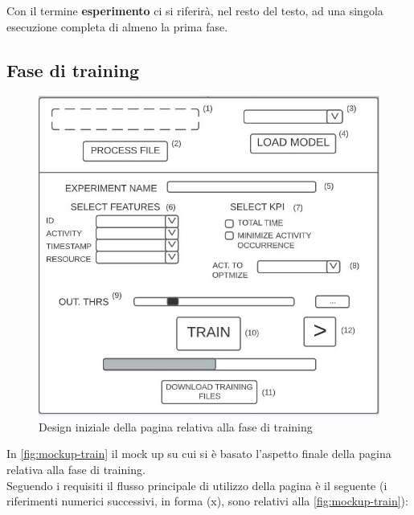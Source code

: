 Con il termine \textbf{esperimento} ci si riferirà, nel resto del testo, ad una singola esecuzione completa di almeno la prima fase.

\subsection{Fase di training}

\begin{figure}[H] 
    \centering 
    \includegraphics[width=0.9\columnwidth]{immagini/mockup-train.jpg} 
    \caption{Design iniziale della pagina relativa alla fase di training}
    \label{fig:mockup-train}
\end{figure}

In \autoref{fig:mockup-train} il mock up su cui si è basato l'aspetto finale della pagina relativa alla fase di training.
\\
Seguendo i requisiti il flusso principale di utilizzo della pagina è il seguente (i riferimenti numerici successivi, in forma (x), sono relativi alla \autoref{fig:mockup-train}):

